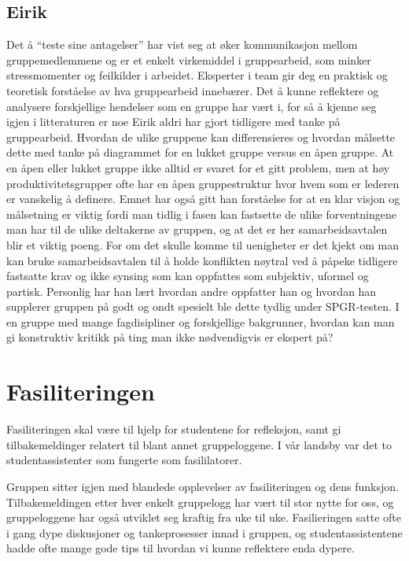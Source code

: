 \documentclass[a4paper,norsk,oneside]{article}
\begin{document}
\subsection{Eirik}
Det å “teste sine antagelser” har vist seg at øker kommunikasjon mellom gruppemedlemmene og er et enkelt virkemiddel i gruppearbeid, som minker stressmomenter og feilkilder i arbeidet. Eksperter i team gir deg en praktisk og teoretisk forståelse av hva gruppearbeid innebærer. Det å kunne reflektere og analysere forskjellige hendelser som en gruppe har vært i, for så å kjenne seg igjen i litteraturen er noe Eirik aldri har gjort tidligere med tanke på gruppearbeid. Hvordan de ulike gruppene kan differensieres og hvordan målsette dette med tanke på diagrammet for en lukket gruppe versus en åpen gruppe. At en åpen eller lukket gruppe ikke alltid er svaret for et gitt problem, men at høy produktivitetsgrupper ofte har en åpen gruppestruktur hvor hvem som er lederen er vanskelig å definere. Emnet har også gitt han forståelse for at en klar visjon og målsetning er viktig fordi man tidlig i fasen kan fastsette de ulike forventningene man har til de ulike deltakerne av gruppen, og at det er her samarbeidsavtalen blir et viktig poeng. For om det skulle komme til uenigheter er det kjekt om man kan bruke samarbeidsavtalen til å holde konflikten nøytral ved å påpeke tidligere fastsatte krav og ikke synsing som kan oppfattes som subjektiv, uformel og partisk. Personlig har han lært hvordan andre oppfatter han og hvordan han supplerer gruppen på godt og ondt spesielt ble dette tydlig under SPGR-testen. I en gruppe med mange fagdisipliner og forskjellige bakgrunner, hvordan kan man gi konstruktiv kritikk på ting man ikke nødvendigvis er ekspert på? 

\section{Fasiliteringen}
Fasiliteringen skal være til hjelp for studentene for refleksjon, samt gi tilbakemeldinger relatert til blant annet gruppeloggene. I vår landsby var det to studentassistenter som fungerte som fasililatorer. 

Gruppen sitter igjen med  blandede opplevelser av fasiliteringen og dens funksjon. Tilbakemeldingen etter hver enkelt gruppelogg har vært til stor nytte for oss, og gruppeloggene har også utviklet seg kraftig fra uke til uke. Fasilieringen satte ofte i gang dype diskusjoner og tankeprosesser innad i gruppen, og studentassistentene hadde ofte mange gode tips til hvordan vi kunne reflektere enda dypere. 
\end{document}
